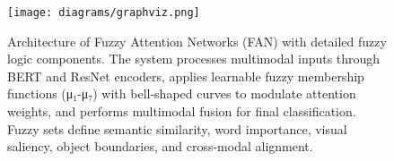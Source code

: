 \begin{figure}[htbp]
    \centering
    \texttt{[image: diagrams/graphviz.png]}
    \caption{Architecture of Fuzzy Attention Networks (FAN) with detailed fuzzy logic components. The system processes multimodal inputs through BERT and ResNet encoders, applies learnable fuzzy membership functions (μ₁-μ₇) with bell-shaped curves to modulate attention weights, and performs multimodal fusion for final classification. Fuzzy sets define semantic similarity, word importance, visual saliency, object boundaries, and cross-modal alignment.}
    \label{fig:fan_architecture}
\end{figure}